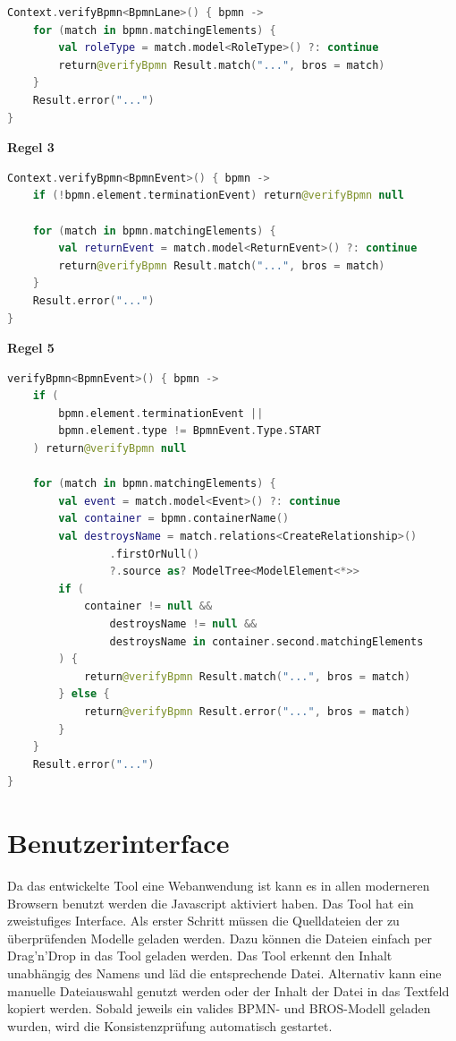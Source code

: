 \begin{lstlisting}[language=Kotlin, caption=Implementierung von Regel 2, label=lst:implementation_rule_2]
Context.verifyBpmn<BpmnLane>() { bpmn ->
    for (match in bpmn.matchingElements) {
        val roleType = match.model<RoleType>() ?: continue
        return@verifyBpmn Result.match("...", bros = match)
    }
    Result.error("...")
}
\end{lstlisting}

\textbf{Regel 3}

\begin{lstlisting}[language=Kotlin, caption=Implementierung von Regel 3, label=lst:implementation_rule_3]
Context.verifyBpmn<BpmnEvent>() { bpmn ->
    if (!bpmn.element.terminationEvent) return@verifyBpmn null

    for (match in bpmn.matchingElements) {
        val returnEvent = match.model<ReturnEvent>() ?: continue
        return@verifyBpmn Result.match("...", bros = match)
    }
    Result.error("...")
}
\end{lstlisting}

\textbf{Regel 5}

\begin{lstlisting}[language=Kotlin, caption=Implementierung von Regel 5, label=lst:implementation_rule_5]
verifyBpmn<BpmnEvent>() { bpmn ->
    if (
        bpmn.element.terminationEvent || 
        bpmn.element.type != BpmnEvent.Type.START
    ) return@verifyBpmn null

    for (match in bpmn.matchingElements) {
        val event = match.model<Event>() ?: continue
        val container = bpmn.containerName()
        val destroysName = match.relations<CreateRelationship>()
                .firstOrNull()
                ?.source as? ModelTree<ModelElement<*>>
        if (
            container != null && 
                destroysName != null && 
                destroysName in container.second.matchingElements
        ) {
            return@verifyBpmn Result.match("...", bros = match)
        } else {
            return@verifyBpmn Result.error("...", bros = match)
        }
    }
    Result.error("...")
}
\end{lstlisting}

\section{Benutzerinterface}

Da das entwickelte Tool eine Webanwendung ist kann es in allen moderneren Browsern benutzt werden die Javascript aktiviert haben.
Das Tool hat ein zweistufiges Interface.
Als erster Schritt müssen die Quelldateien der zu überprüfenden Modelle geladen werden.
Dazu können die Dateien einfach per Drag'n'Drop in das Tool geladen werden.
Das Tool erkennt den Inhalt unabhängig des Namens und läd die entsprechende Datei.
Alternativ kann eine manuelle Dateiauswahl genutzt werden oder der Inhalt der Datei in das Textfeld kopiert werden.
Sobald jeweils ein valides BPMN- und BROS-Modell geladen wurden, wird die Konsistenzprüfung automatisch gestartet.

